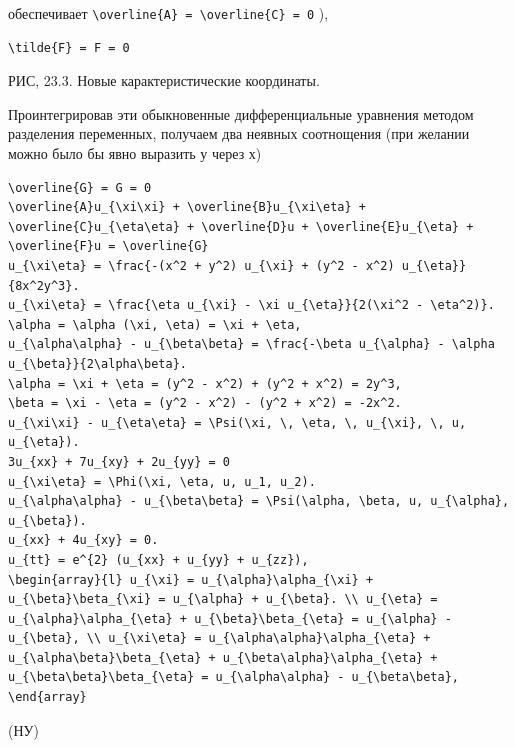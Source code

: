 \documentclass[
  ukrainian,
]{article}
\begin{document}
обеспечивает
\texttt{\textbackslash{}overline\{A\}\ =\ \textbackslash{}overline\{C\}\ =\ 0}
),

\begin{verbatim}
\tilde{F} = F = 0
\end{verbatim}

РИС, 23.3. Новые карактеристические координаты.

Проинтегрировав эти обыкновенные дифференциальные уравнения методом
разделения переменных, получаем два неявных соотнощения (при желании
можно было бы явно выразить у через х)

\begin{verbatim}
\overline{G} = G = 0
\overline{A}u_{\xi\xi} + \overline{B}u_{\xi\eta} + \overline{C}u_{\eta\eta} + \overline{D}u + \overline{E}u_{\eta} + \overline{F}u = \overline{G}
u_{\xi\eta} = \frac{-(x^2 + y^2) u_{\xi} + (y^2 - x^2) u_{\eta}}{8x^2y^3}.
u_{\xi\eta} = \frac{\eta u_{\xi} - \xi u_{\eta}}{2(\xi^2 - \eta^2)}.
\alpha = \alpha (\xi, \eta) = \xi + \eta,
u_{\alpha\alpha} - u_{\beta\beta} = \frac{-\beta u_{\alpha} - \alpha u_{\beta}}{2\alpha\beta}.
\alpha = \xi + \eta = (y^2 - x^2) + (y^2 + x^2) = 2y^3,
\beta = \xi - \eta = (y^2 - x^2) - (y^2 + x^2) = -2x^2.
u_{\xi\xi} - u_{\eta\eta} = \Psi(\xi, \, \eta, \, u_{\xi}, \, u, u_{\eta}).
3u_{xx} + 7u_{xy} + 2u_{yy} = 0
u_{\xi\eta} = \Phi(\xi, \eta, u, u_1, u_2).
u_{\alpha\alpha} - u_{\beta\beta} = \Psi(\alpha, \beta, u, u_{\alpha}, u_{\beta}).
u_{xx} + 4u_{xy} = 0.
u_{tt} = e^{2} (u_{xx} + u_{yy} + u_{zz}),
\begin{array}{l} u_{\xi} = u_{\alpha}\alpha_{\xi} + u_{\beta}\beta_{\xi} = u_{\alpha} + u_{\beta}. \\ u_{\eta} = u_{\alpha}\alpha_{\eta} + u_{\beta}\beta_{\eta} = u_{\alpha} - u_{\beta}, \\ u_{\xi\eta} = u_{\alpha\alpha}\alpha_{\eta} + u_{\alpha\beta}\beta_{\eta} + u_{\beta\alpha}\alpha_{\eta} + u_{\beta\beta}\beta_{\eta} = u_{\alpha\alpha} - u_{\beta\beta}, \end{array}
\end{verbatim}

(НУ)
\end{document}
